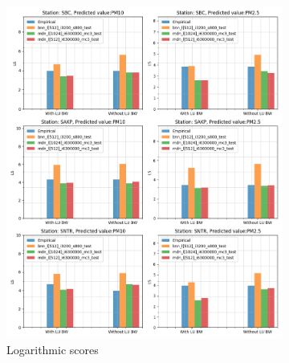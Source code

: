 \documentclass[12pt,a4paper,twoside]{scrartcl}
\numberwithin{equation}{section}
\newcounter{mypagecount}%
\newenvironment{interlude}{%
  \clearpage
  \setcounter{mypagecount}{\value{page}}%
  \thispagestyle{empty}%
  \pagestyle{empty}%
}{%
  \clearpage
  \setcounter{page}{\value{mypagecount}}%
}
\begin{document}
\begin{interlude}
\begin{appendices}
\begin{figure}[h!]
\begin{subfigure}[t]{0.49\textwidth}
        \includegraphics[width=\textwidth,height=1.2\textwidth]{figures/figs_1h/results_plot_LS}%
        \caption{Logarithmic scores}
      \end{subfigure}
      \begin{subfigure}[t]{0.49\textwidth}

\end{subfigure}
\end{figure}
\end{appendices}
\end{interlude}
\end{document}
